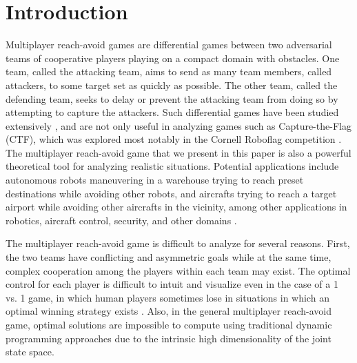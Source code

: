 \section{Introduction}

Multiplayer reach-avoid games are differential games between two adversarial teams of cooperative players playing on a compact domain with obstacles. One team, called the attacking team, aims to send as many team members, called attackers, to some target set as quickly as possible. The other team, called the defending team, seeks to delay or prevent the attacking team from doing so by attempting to capture the attackers. Such differential games have been studied extensively \cite{HThesis, Huang2011}, and are not only useful in analyzing games such as Capture-the-Flag (CTF), which was explored most notably in the Cornell Roboflag competition \cite{Earl:2007p101, Campbell:2003p5, Waydo:2003p97, Parasuraman:2005p99}. The multiplayer reach-avoid game that we present in this paper is also a powerful theoretical tool for analyzing realistic situations. Potential applications include autonomous robots maneuvering in a warehouse trying to reach preset destinations while avoiding other robots, and aircrafts trying to reach a target airport while avoiding other aircrafts in the vicinity, among other applications in robotics, aircraft control, security, and other domains \cite{OFTHEAIRFORCEWASHINGTON:2009p37, Erzberger:2006p44, kiva2009}.


The multiplayer reach-avoid game is difficult to analyze for several reasons. First, the two teams have conflicting and asymmetric goals while at the same time, complex cooperation among the players within each team may exist. The optimal control for each player is difficult to intuit and visualize even in the case of a 1 vs. 1 game, in which human players sometimes lose in situations in which an optimal winning strategy exists \cite{HThesis, Huang2011}. Also, in the general multiplayer reach-avoid game, optimal solutions are impossible to compute using traditional dynamic programming approaches due to the intrinsic high dimensionality of the joint state space. 


